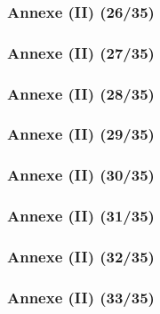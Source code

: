 \documentclass{beamer}
\begin{document}
{\begin{frame}
\frametitle{Annexe (II) (26/35)}



\end{frame}

\begin{frame}
\frametitle{Annexe (II) (27/35)}



\end{frame}

\begin{frame}
\frametitle{Annexe (II) (28/35)}



\end{frame}

\begin{frame}
\frametitle{Annexe (II) (29/35)}



\end{frame}

\begin{frame}
\frametitle{Annexe (II) (30/35)}



\end{frame}

\begin{frame}
\frametitle{Annexe (II) (31/35)}



\end{frame}

\begin{frame}
\frametitle{Annexe (II) (32/35)}



\end{frame}

\begin{frame}
\frametitle{Annexe (II) (33/35)}


\end{frame}}
\end{document}
